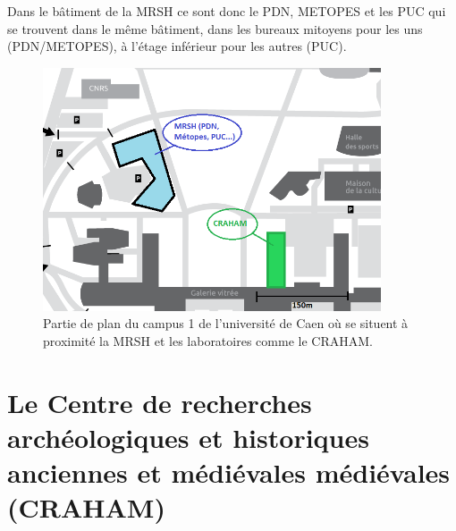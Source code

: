 \documentclass[a4paper,12pt,twoside]{book}
\begin{document}
    Dans le bâtiment de la \acrshort{MRSH} ce sont donc le \acrshort{PDN}, \acrshort{METOPES} et les \acrshort{PUC} qui se trouvent dans le même bâtiment, dans les bureaux mitoyens pour les uns (\acrshort{PDN}/METOPES), à l'étage inférieur pour les autres (\acrshort{PUC}).
    
    \begin{figure}[H]
        \centering
        \includegraphics[width=10cm]{img/partie_1/campus-univ-zoom.png}
        \caption{Partie de plan du campus 1 de l'université de Caen où se situent à proximité la \acrshort{MRSH} et les laboratoires comme le CRAHAM.}
    \end{figure}
   
    
    \section{Le Centre de recherches archéologiques et historiques anciennes et médiévales médiévales (CRAHAM)}
    
\end{document}

